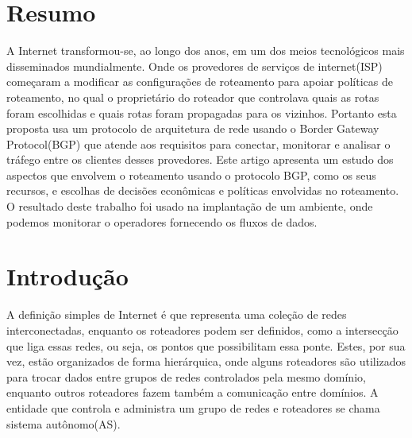 \documentclass[12pt,a4paper]{report}
\begin{document}
\newpage

\chapter*{Resumo}
A Internet transformou-se, ao longo dos anos, em um dos meios tecnol\'ogicos mais disseminados mundialmente. Onde os provedores de servi\c{c}os de internet(ISP) come\c{c}aram a modificar as configura\c{c}\~oes de roteamento para apoiar pol\'iticas de roteamento, no qual o propriet\'ario do roteador que controlava quais as rotas foram escolhidas e quais rotas foram propagadas para os vizinhos. Portanto esta proposta usa um protocolo de arquitetura de rede usando o Border Gateway Protocol(BGP) que atende aos requisitos para conectar, monitorar e analisar o tr\'afego entre os clientes desses provedores. Este artigo apresenta um estudo dos aspectos que envolvem o roteamento usando o protocolo BGP, como os seus recursos, e escolhas de decis\~oes econ\^omicas e pol\'iticas envolvidas no roteamento. O resultado deste trabalho foi usado na implanta\c{c}\~ao de um ambiente, onde podemos monitorar o operadores fornecendo os fluxos de dados.

\newpage
\tableofcontents
\newpage

\pagestyle{fancy}
\renewcommand{\chaptermark}[1]{\markboth{#1}{}}
\renewcommand{\sectionmark}[1]{\markright{\thesection\ #1}}

\lhead[\fancyplain{}{\bfseries\leftmark}]{\fancyplain{}{\bfseries\leftmark}}
\rhead[\fancyplain{}{\bfseries\thepage}]{\fancyplain{}{\bfseries\thepage}}
\setlength{\footskip}{\dimexpr\headsep+1.5\baselineskip+.4pt}
\setcounter{page}{1}


\chapter{Introdu\c{c}\~ao}
A defini\c{c}\~ao simples de Internet \'e que representa uma cole\c{c}\~ao de redes interconectadas, enquanto os roteadores podem ser definidos, como a intersec\c{c}\~ao que liga essas redes, ou seja, os pontos que possibilitam essa ponte. Estes, por sua vez, est\~ao organizados de forma hier\'arquica, onde alguns roteadores s\~ao utilizados para trocar dados entre grupos de redes controlados pela mesmo dom\'inio, enquanto outros roteadores fazem tamb\'em a comunica\c{c}\~ao entre dom\'inios. A entidade que controla e administra um grupo de redes e roteadores se chama sistema aut\^onomo(AS).
\end{document}
